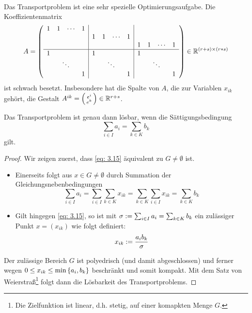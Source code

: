 \begin{bemerkung} %
	Das Transportproblem ist eine sehr spezielle Optimierungsaufgabe. Die Koeffizientenmatrix 
	\begin{equation*}
		A = 
		\left( \begin{array}{cccc|cccc|cccc}
		1 & 1 & \cdots & 1 &   &   &        &   &   &   &        &\\
		  &   &        &   & 1 & 1 & \cdots & 1 &   &   &        &\\
		  &   &        &   &   &   &        &   & 1 & 1 & \cdots & 1  \\
		\hline
		1 &   &        &   & 1 &   &        &   & 1 &   &        &  \\
		  & \multicolumn{2}{c}{\ddots} & & & \multicolumn{2}{c}{\ddots} & & & \multicolumn{2}{c}{\ddots} & \\
		  &   &        & 1 &   &   &        & 1 &   &   &        & 1  \\	  
		\end{array} \right) \in \R^{(r+s) \times (r*s)}
	\end{equation*}
	ist schwach besetzt. Insbesondere hat die Spalte von $A$, die zur Variablen $x_{ik}$ gehört, die Gestalt $A^{ik} = \begin{psmallmatrix} e^i \\ e^k \end{psmallmatrix} \in \mathbb{R}^{r+s}$.
\end{bemerkung}

\begin{satz} %
	Das Transportproblem ist genau dann lösbar, wenn die Sättigungsbedingung
	\begin{equation}
		\sum_{i \in I} a_i = \sum_{k \in K} b_k
		\label{eq: 3.15}
	\end{equation}
	gilt.
\end{satz}
\begin{proof}
	Wir zeigen zuerst, dass \eqref{eq: 3.15}  äquivalent zu $G \neq \emptyset$ ist.
	\begin{itemize}
		\item Einerseits folgt aus $x \in G \neq \emptyset$ durch Summation der Gleichungsnebenbedingungen
		\begin{equation*}
			\sum_{i \in I} a_i = \sum_{i \in I} \sum_{k \in K} x_{ik} = \sum_{k \in K} \sum_{i \in I} x_{ik} = \sum_{k \in K} b_k
		\end{equation*}
		\item  Gilt hingegen \eqref{eq: 3.15}, so ist mit $\sigma \mathrel{:=} \sum_{i \in I} a_i = \sum_{k \in K} b_k$ ein zulässiger Punkt $x = (x_{ik})$ wie folgt definiert:
		\begin{equation*}
			x_{ik} \mathrel{:=} \frac{a_i b_k}{\sigma}
		\end{equation*}
	\end{itemize}
	Der zulässige Bereich $G$ ist polyedrisch (und damit abgeschlossen) und ferner wegen $0 \le x_{ik} \le \min\left\{ a_i, b_k \right\}$ beschränkt und somit kompakt.
	Mit dem Satz von Weierstraß\footnote{Die Zielfunktion ist linear, d.h. stetig, auf einer komapkten Menge $G$.} folgt dann die Lösbarkeit des Transportproblems.
\end{proof}

